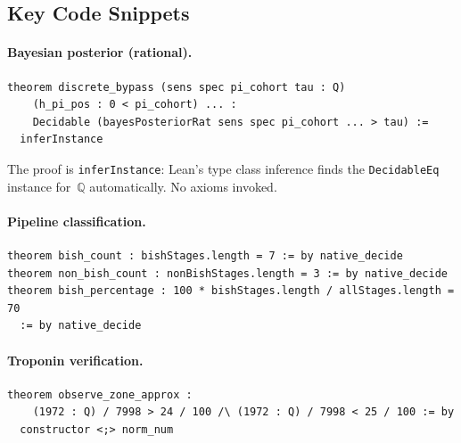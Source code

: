 \documentclass[11pt,a4paper]{article}
\theoremstyle{plain}
\theoremstyle{definition}
\newcommand{\Q}{\mathbb{Q}}
\begin{document}
\subsection{Key Code Snippets}

\paragraph{Bayesian posterior (rational).}

\begin{tcolorbox}[leanbox={BayesianInference.lean — Discrete Bypass}]
\begin{lstlisting}
theorem discrete_bypass (sens spec pi_cohort tau : Q)
    (h_pi_pos : 0 < pi_cohort) ... :
    Decidable (bayesPosteriorRat sens spec pi_cohort ... > tau) :=
  inferInstance
\end{lstlisting}
\end{tcolorbox}

The proof is \texttt{inferInstance}: Lean's type class inference finds the \texttt{DecidableEq} instance for~$\Q$ automatically.  No axioms invoked.

\paragraph{Pipeline classification.}

\begin{tcolorbox}[leanbox={CRMPipeline.lean — Pipeline Statistics}]
\begin{lstlisting}
theorem bish_count : bishStages.length = 7 := by native_decide
theorem non_bish_count : nonBishStages.length = 3 := by native_decide
theorem bish_percentage : 100 * bishStages.length / allStages.length = 70
  := by native_decide
\end{lstlisting}
\end{tcolorbox}

\paragraph{Troponin verification.}

\begin{tcolorbox}[leanbox={TroponinCalculations.lean — Grey Zone Fraction}]
\begin{lstlisting}
theorem observe_zone_approx :
    (1972 : Q) / 7998 > 24 / 100 /\ (1972 : Q) / 7998 < 25 / 100 := by
  constructor <;> norm_num
\end{lstlisting}
\end{tcolorbox}
\end{document}

